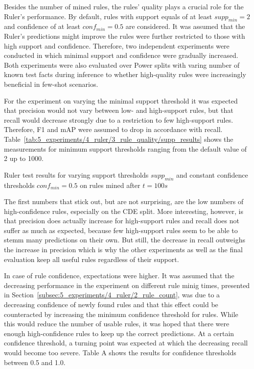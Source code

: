 Besides the number of mined rules, the rules' quality plays a crucial role for the Ruler's performance. By default, rules with support equals of at least $supp_{min} = 2$ and confidence of at least $conf_{min} = 0.5$ are considered. It was assumed that the Ruler's predictions might improve the rules were further restricted to those with high support and confidence. Therefore, two independent experiments were conducted in which minimal support and confidence were gradually increased. Both experiments were also evaluated over Power splits with varing number of known test facts during inference to whether high-quality rules were increasingly beneficial in few-shot scenarios.

For the experiment on varying the minimal support threshold it was expected that precision would not vary between low- and high-support rules, but that recall would decrease strongly due to a restriction to few high-support rules. Therefore, F1 and mAP were assumed to drop in accordance with recall. Table~\ref{tab:5_experiments/4_ruler/3_rule_quality/supp_results} shows the measurements for minimum support thresholds ranging from the default value of 2 up to 1000.

\begin{table}
    \centering
    
    \caption{Ruler test results for varying support thresholds $supp_{min}$ and constant confidence thresholds $conf_{min} = 0.5$ on rules mined after $t = 100s$}
    \label{tab:5_experiments/4_ruler/3_rule_quality/supp_results}
\end{table}

The first numbers that stick out, but are not surprising, are the low numbers of high-confidence rules, especially on the CDE split. More interesting, however, is that precision does actually increase for high-support rules and recall does not suffer as much as expected, because few high-support rules seem to be able to stemm many predictions on their own. But still, the decrease in recall outweighs the increase in precision which is why the other experiments as well as the final evaluation keep all useful rules regardless of their support.

In case of rule confidence, expectations were higher. It was assumed that the decreasing performance in the experiment on different rule minig times, presented in Section~\ref{subsec:5_experiments/4_ruler/2_rule_count}, was due to a decreasing confidence of newly found rules and that this effect could be counteracted by increasing the minimum confidence threshold for rules. While this would reduce the number of usable rules, it was hoped that there were enough high-confidence rules to keep up the correct predictions. At a certain confidence threshold, a turning point was expected at which the decreasing recall would become too severe. Table A shows the results for confidence thresholds between 0.5 and 1.0.

